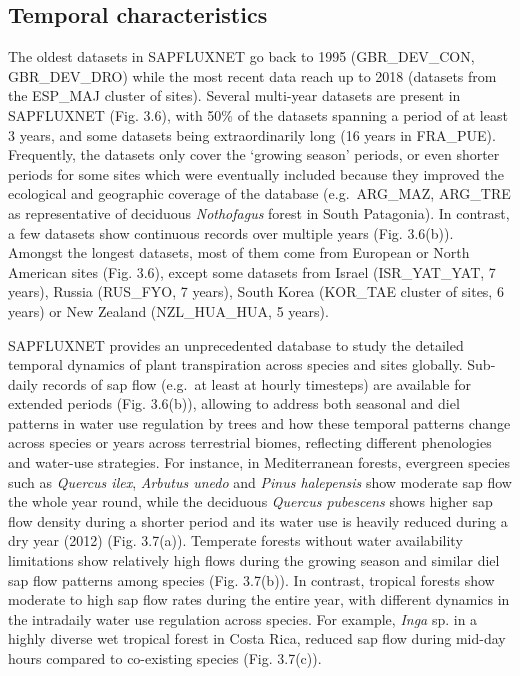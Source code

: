 \documentclass[11pt,twoside]{reedthesis}
\begin{document}
\subsection{Temporal characteristics}\label{temporal-characteristics}

The oldest datasets in SAPFLUXNET go back to 1995 (GBR\_DEV\_CON,
GBR\_DEV\_DRO) while the most recent data reach up to 2018 (datasets
from the ESP\_MAJ cluster of sites). Several multi-year datasets are
present in SAPFLUXNET (Fig. 3.6), with 50\% of the datasets spanning a
period of at least 3 years, and some datasets being extraordinarily long
(16 years in FRA\_PUE). Frequently, the datasets only cover the `growing
season' periods, or even shorter periods for some sites which were
eventually included because they improved the ecological and geographic
coverage of the database (e.g.~ARG\_MAZ, ARG\_TRE as representative of
deciduous \emph{Nothofagus} forest in South Patagonia). In contrast, a
few datasets show continuous records over multiple years (Fig. 3.6(b)).
Amongst the longest datasets, most of them come from European or North
American sites (Fig. 3.6), except some datasets from Israel
(ISR\_YAT\_YAT, 7 years), Russia (RUS\_FYO, 7 years), South Korea
(KOR\_TAE cluster of sites, 6 years) or New Zealand (NZL\_HUA\_HUA, 5
years).\par 

SAPFLUXNET provides an unprecedented database to study the detailed
temporal dynamics of plant transpiration across species and sites
globally. Sub-daily records of sap flow (e.g.~at least at hourly
timesteps) are available for extended periods (Fig. 3.6(b)), allowing to
address both seasonal and diel patterns in water use regulation by trees
and how these temporal patterns change across species or years across
terrestrial biomes, reflecting different phenologies and water-use
strategies. For instance, in Mediterranean forests, evergreen species
such as \emph{Quercus ilex}, \emph{Arbutus unedo} and \emph{Pinus
halepensis} show moderate sap flow the whole year round, while the
deciduous \emph{Quercus pubescens} shows higher sap flow density during
a shorter period and its water use is heavily reduced during a dry year
(2012) (Fig. 3.7(a)). Temperate forests without water availability
limitations show relatively high flows during the growing season and
similar diel sap flow patterns among species (Fig. 3.7(b)). In contrast,
tropical forests show moderate to high sap flow rates during the entire
year, with different dynamics in the intradaily water use regulation
across species. For example, \emph{Inga} sp. in a highly diverse wet
tropical forest in Costa Rica, reduced sap flow during mid-day hours
compared to co-existing species (Fig. 3.7(c)).\par
\end{document}
